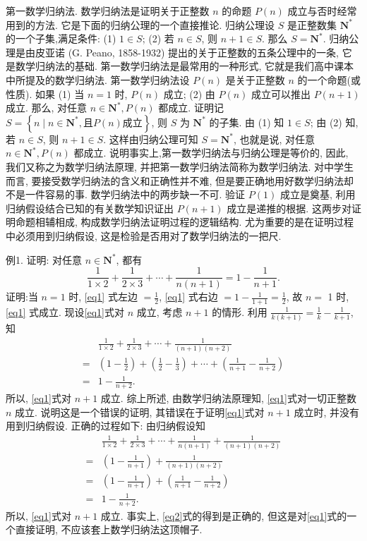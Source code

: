 
第一数学归纳法.
数学归纳法是证明关于正整数 $n$ 的命题 $P(n)$ 成立与否时经常用到的方法.
它是下面的归纳公理的一个直接推论.
归纳公理设 $S$ 是正整数集 $\mathbf{N}^*$ 的一个子集,满足条件:
(1) $1 \in S$;
(2) 若 $n \in S$, 则 $n+1 \in S$.
那么 $S=\mathbf{N}^*$.
归纳公理是由皮亚诺 (G. Peano, 1858-1932) 提出的关于正整数的五条公理中的一条, 它是数学归纳法的基础.
第一数学归纳法是最常用的一种形式, 它就是我们高中课本中所提及的数学归纳法.
第一数学归纳法设 $P(n)$ 是关于正整数 $n$ 的一个命题(或性质). 如果
(1) 当 $n=1$ 时, $P(n)$ 成立;
(2) 由 $P(n)$ 成立可以推出 $P(n+1)$ 成立.
那么, 对任意 $n \in \mathbf{N}^*, P(n)$ 都成立.
证明记 $S=\left\{n \mid n \in \mathbf{N}^*, \text{且} P(n) \text{成立} \right\}$, 则 $S$ 为 $\mathbf{N}^*$ 的子集.
由 (1) 知 $1 \in S$; 由 (2) 知, 若 $n \in S$, 则 $n+1 \in S$. 这样由归纳公理可知 $S=\mathbf{N}^*$, 也就是说, 对任意 $n \in \mathbf{N}^*, P(n)$ 都成立.
说明事实上,第一数学归纳法与归纳公理是等价的, 因此, 我们又称之为数学归纳法原理, 并把第一数学归纳法简称为数学归纳法.
对中学生而言, 要接受数学归纳法的含义和正确性并不难, 但是要正确地用好数学归纳法却不是一件容易的事.
数学归纳法中的两步缺一不可.
验证 $P(1)$ 成立是奠基, 利用归纳假设结合已知的有关数学知识证出 $P(n+1)$ 成立是递推的根据.
这两步对证明命题相辅相成, 构成数学归纳法证明过程的逻辑结构.
尤为重要的是在证明过程中必须用到归纳假设, 这是检验是否用对了数学归纳法的一把尺.



例1. 证明: 对任意 $n \in \mathbf{N}^*$, 都有
$$
\frac{1}{1 \times 2}+\frac{1}{2 \times 3}+\cdots+\frac{1}{n(n+1)}=1-\frac{1}{n+1} . \label{eq1}
$$
证明:当 $n=1$ 时, \ref{eq1} 式左边 $=\frac{1}{2}$, \ref{eq1} 式右边 $=1-\frac{1}{1+1}=\frac{1}{2}$, 故 $n=$ 1 时, \ref{eq1} 式成立.
现设\ref{eq1}式对 $n$ 成立, 考虑 $n+1$ 的情形.
利用 $\frac{1}{k(k+1)}=\frac{1}{k}-\frac{1}{k+1}$, 知
$$
\begin{aligned}
& \frac{1}{1 \times 2}+\frac{1}{2 \times 3}+\cdots+\frac{1}{(n+1)(n+2)} \\
= & \left(1-\frac{1}{2}\right)+\left(\frac{1}{2}-\frac{1}{3}\right)+\cdots+\left(\frac{1}{n+1}-\frac{1}{n+2}\right) \\
= & 1-\frac{1}{n+2} .
\end{aligned} \label{eq2}
$$
所以, \ref{eq1}式对 $n+1$ 成立.
综上所述, 由数学归纳法原理知, \ref{eq1}式对一切正整数 $n$ 成立.
说明这是一个错误的证明, 其错误在于证明\ref{eq1}式对 $n+1$ 成立时, 并没有用到归纳假设.
正确的过程如下:
由归纳假设知
$$
\begin{aligned}
& \frac{1}{1 \times 2}+\frac{1}{2 \times 3}+\cdots+\frac{1}{n(n+1)}+\frac{1}{(n+1)(n+2)} \\
= & \left(1-\frac{1}{n+1}\right)+\frac{1}{(n+1)(n+2)} \\
= & \left(1-\frac{1}{n+1}\right)+\left(\frac{1}{n+1}-\frac{1}{n+2}\right) \\
= & 1-\frac{1}{n+2} .
\end{aligned}
$$
所以, \ref{eq1}式对 $n+1$ 成立.
事实上, \ref{eq2}式的得到是正确的, 但这是对\ref{eq1}式的一个直接证明, 不应该套上数学归纳法这顶帽子.



